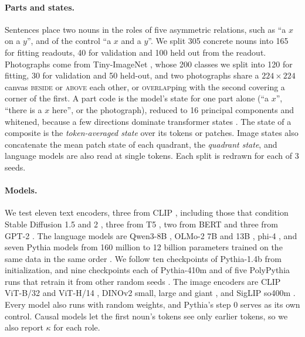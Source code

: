 \documentclass[10pt]{article}
\theoremstyle{plain}
\theoremstyle{remark}
\begin{document}
\paragraph{Parts and states.} Sentences place two nouns in the roles of five asymmetric relations, such as ``a $x$ on a $y$'', and of the control ``a $x$ and a $y$''. We split 305 concrete nouns into 165 for fitting readouts, 40 for validation and 100 held out from the readout. Photographs come from Tiny-ImageNet \citep{le2015tiny}, whose 200 classes we split into 120 for fitting, 30 for validation and 50 held-out, and two photographs share a $224 \times 224$ canvas \textsc{beside} or \textsc{above} each other, or \textsc{overlap}ping with the second covering a corner of the first. A part code is the model's state for one part alone (``a $x$'', ``there is a $x$ here'', or the photograph), reduced to 16 principal components and whitened, because a few directions dominate transformer states \citep{ethayarajh2019,timkey2021}. The state of a composite is the \emph{token-averaged state} over its tokens or patches. Image states also concatenate the mean patch state of each quadrant, the \emph{quadrant state}, and language models are also read at single tokens. Each split is redrawn for each of 3 seeds.

\paragraph{Models.} We test eleven text encoders, three from CLIP \citep{radford2021clip}, including those that condition Stable Diffusion 1.5 and 2 \citep{rombach2022}, three from T5 \citep{raffel2020t5}, two from BERT \citep{devlin2019bert} and three from GPT-2 \citep{radford2019gpt2}. The language models are Qwen3-8B \citep{yang2025qwen3}, OLMo-2 7B and 13B \citep{olmo2024olmo2}, phi-4 \citep{abdin2024phi4}, and seven Pythia models from 160 million to 12 billion parameters trained on the same data in the same order \citep{biderman2023pythia}. We follow ten checkpoints of Pythia-1.4b from initialization, and nine checkpoints each of Pythia-410m and of five PolyPythia runs that retrain it from other random seeds \citep{vanderwal2025polypythias}. The image encoders are CLIP ViT-B/32 and ViT-H/14 \citep{radford2021clip,cherti2023}, DINOv2 small, large and giant \citep{oquab2024dinov2}, and SigLIP so400m \citep{zhai2023siglip}. Every model also runs with random weights, and Pythia's step 0 serves as its own control. Causal models let the first noun's tokens see only earlier tokens, so we also report $\kappa$ for each role.
\end{document}
